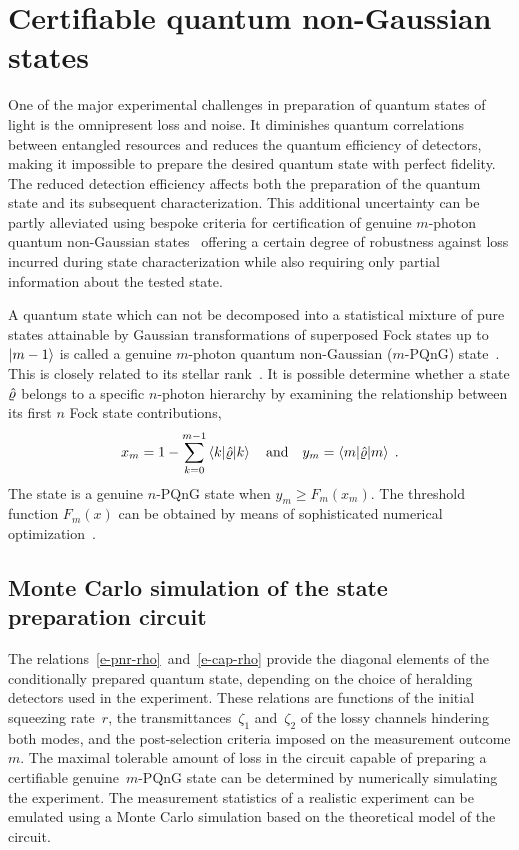 \documentclass{article}
\begin{document}
\section{Certifiable quantum non-Gaussian states}

One of the major experimental challenges in preparation of quantum states of light is the omnipresent loss and noise. It diminishes quantum correlations between entangled resources and reduces the quantum efficiency of detectors, making it impossible to prepare the desired quantum state with perfect fidelity. The reduced detection efficiency affects both the preparation of the quantum state and its subsequent characterization. This additional uncertainty can be partly alleviated using bespoke criteria for certification of genuine $m$-photon quantum non-Gaussian states~\cite{lachman2019} offering a certain degree of robustness against loss incurred during state characterization while also requiring only partial information about the tested state.

A quantum state which can not be decomposed into a statistical mixture of pure states attainable by Gaussian transformations of superposed Fock states up to ${\ket{m - 1}}$ is called a genuine $m$-photon quantum non-Gaussian ($m$-PQnG) state~\cite{lachman2019}. This is closely related to its stellar rank~\cite{chabaud2020,fiurasek2022}. It is possible determine whether a state $\hat{\varrho}$ belongs to a specific $n$-photon hierarchy by examining the relationship between its first $n$ Fock state contributions,
%
\begin{equation}
  x_{m} 
    = 1 - \sum_{k = 0}^{m - 1} 
      \braket{k | \hat{\varrho} | k}
  \quad\text{and}\quad
  y_{m} = \braket{m | \hat{\varrho} | m}
  \;\text{.}
\end{equation}
%
The state is a genuine $n$-PQnG state when ${y_{m} \geq F_{m} (x_{m})}$. The threshold function $F_{m}(x)$ can be obtained by means of sophisticated numerical optimization~\cite{lachman2019,fiurasek2022}.

%
%

\subsection*{Monte Carlo simulation of the state preparation circuit}

The relations~\eqref{e-pnr-rho}~and~\eqref{e-cap-rho} provide the diagonal elements of the conditionally prepared quantum state, depending on the choice of heralding detectors used in the experiment. These relations are functions of the initial squeezing rate~$r$, the transmittances~$\zeta_{1}$ and~$\zeta_{2}$ of the lossy channels hindering both modes, and the post-selection criteria imposed on the measurement outcome $m$. The maximal tolerable amount of loss in the circuit capable of preparing a certifiable genuine~$m$-PQnG state can be determined by numerically simulating the experiment. The measurement statistics of a realistic experiment can be emulated using a Monte Carlo simulation based on the theoretical model of the circuit. 
\end{document}
